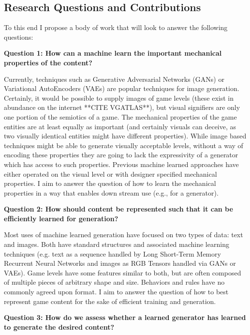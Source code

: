 \documentclass[12pt]{report}
\begin{document}
\subsection*{Research Questions and Contributions}

To this end I propose a body of work that will look to answer the following questions:

\textbf{Question 1: How can a machine learn the important mechanical properties of the content?}

Currently, techniques such as Generative Adversarial Networks (GANs) or Variational AutoEncoders (VAEs) are popular techniques for image generation.  Certainly, it would be possible to supply images of game levels (these exist in abundance on the internet **CITE VGATLAS**), but visual signifiers are only one portion of the semiotics of a game.  The mechanical properties of the game entities are at least equally as important (and certainly visuals can deceive, as two visually identical entities might have different properties).  While image based techniques might be able to generate visually acceptable levels, without a way of encoding these properties they are going to lack the expressivity of a generator which has access to such properties.  Previous machine learned approaches have either operated on the visual level or with designer specified mechanical properties.   I aim to answer the question of how to learn the mechanical properties in a way that enables down stream use (e.g., for a generator).


\textbf{Question 2: How should content be represented such that it can be efficiently learned for generation?}

Most uses of machine learned generation have focused on two types of data: text and images.  Both have standard structures and associated machine learning techniques (e.g. text as a sequence handled by Long Short-Term Memory Recurrent Neural Networks and images as RGB Tensors handled via GANs or VAEs).  Game levels have some features similar to both, but are often composed of multiple pieces of arbitrary shape and size.  Behaviors and rules have no commonly agreed upon format.  I aim to answer the question of how to best represent game content for the sake of efficient training and generation.

\textbf{Question 3: How do we assess whether a learned generator has learned to generate the desired content?}
\end{document}
